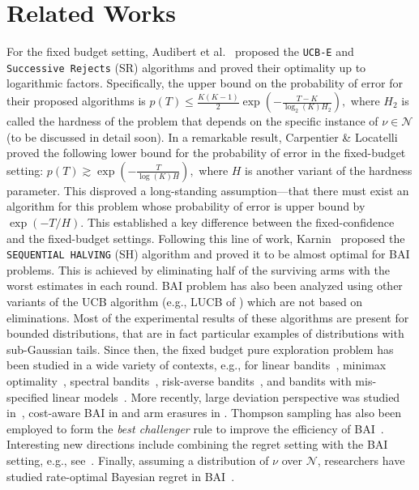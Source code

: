 \section{Related Works}
For the fixed budget setting, Audibert et al.~\cite{audibert2010best} proposed the \texttt{UCB-E} and \texttt{Successive Rejects} (SR) algorithms and proved their optimality up to logarithmic factors. Specifically, the upper bound on the probability of error for their proposed algorithms is
    $p(T) \leq \frac{K (K-1)}{2} \exp\left(- \frac{T - K}{\log_2 (K) H_2}\right),$
where $H_2$ is called the hardness of the problem that depends on the specific instance of $\nu \in \mathcal{N}$ (to be discussed in detail soon). In a remarkable result, Carpentier \& Locatelli~\cite{carpentier2016tight} proved the following lower bound for the probability of error in the fixed-budget setting:
       $p(T) \gtrsim \exp\left(-\frac{T}{\log(K) H}\right),$
where $H$ is another variant of the hardness parameter. This disproved a long-standing assumption—that there must exist an algorithm for this problem whose probability of error is upper bound by $\exp(-T/H)$. This established a key difference between the fixed-confidence and the fixed-budget settings. Following this line of work, Karnin~\cite{karnin2013almost} proposed the \texttt{SEQUENTIAL HALVING} ({SH}) algorithm and proved it to be almost optimal for BAI problems. This is achieved by eliminating half of the surviving arms with the worst estimates in each round. \ac{BAI} problem has also been analyzed using other variants of the \ac{UCB} algorithm (e.g., LUCB of \cite{LUCB}) which are not based on eliminations. Most of the experimental results of these algorithms are present for bounded distributions, that are in fact particular examples of distributions with sub-Gaussian tails. Since then, the fixed budget pure exploration problem has been studied in a wide variety of contexts, e.g., for linear bandits~\cite{jedra2020optimal}, minimax optimality~\cite{yang2022minimax}, spectral bandits~\cite{kocak2020best}, risk-averse bandits~\cite{kagrecha2022statistically}, and bandits with mis-specified linear models~\cite{alieva2021robust}. More recently, large deviation perspective was studied in~\cite{wang2024best}, cost-aware BAI in \cite{qin2025cost} and arm erasures in \cite{reddy2024best}. Thompson sampling has also been employed to form the {\it best challenger} rule to improve the efficiency of \ac{BAI}~\cite{lee2024thompson}. Interesting new directions include combining the regret setting with the BAI setting, e.g., see~\cite{zhang2024fast, qin2024optimizing}. Finally, assuming a distribution of $\nu$ over $\mathcal{N}$, researchers have studied rate-optimal Bayesian regret in \ac{BAI}~\cite{komiyama2024rate}.